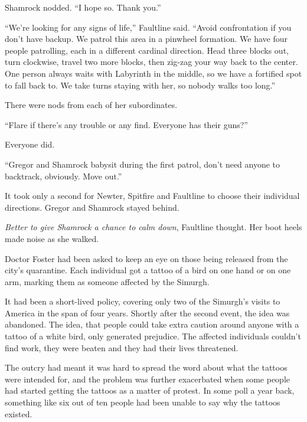 Shamrock nodded.  ``I hope so.  Thank you.''



``We're looking for any signs of life,'' Faultline said.  ``Avoid confrontation if you don't have backup.  We patrol this area in a pinwheel formation.  We have four people patrolling, each in a different cardinal direction.  Head three blocks out, turn clockwise, travel two more blocks, then zig-zag your way back to the center.  One person always waits with Labyrinth in the middle, so we have a fortified spot to fall back to.  We take turns staying with her, so nobody walks too long.''



There were nods from each of her subordinates.



``Flare if there's any trouble or any find.  Everyone has their guns?''



Everyone did.



``Gregor and Shamrock babysit during the first patrol, don't need anyone to backtrack, obviously.  Move out.''



It took only a second for Newter, Spitfire and Faultline to choose their individual directions.  Gregor and Shamrock stayed behind.



\emph{Better to give Shamrock a chance to calm down}, Faultline thought.  Her boot heels made noise as she walked.



Doctor Foster had been asked to keep an eye on those being released from the city's quarantine.  Each individual got a tattoo of a bird on one hand or on one arm, marking them as someone affected by the Simurgh.



It had been a short-lived policy, covering only two of the Simurgh's visits to America in the span of four years.  Shortly after the second event, the idea was abandoned.  The idea, that people could take extra caution around anyone with a tattoo of a white bird, only generated prejudice.  The affected individuals couldn't find work, they were beaten and they had their lives threatened.



The outcry had meant it was hard to spread the word about what the tattoos were intended for, and the problem was further exacerbated when some people had started getting the tattoos as a matter of protest.  In some poll a year back, something like six out of ten people had been unable to say why the tattoos existed.



